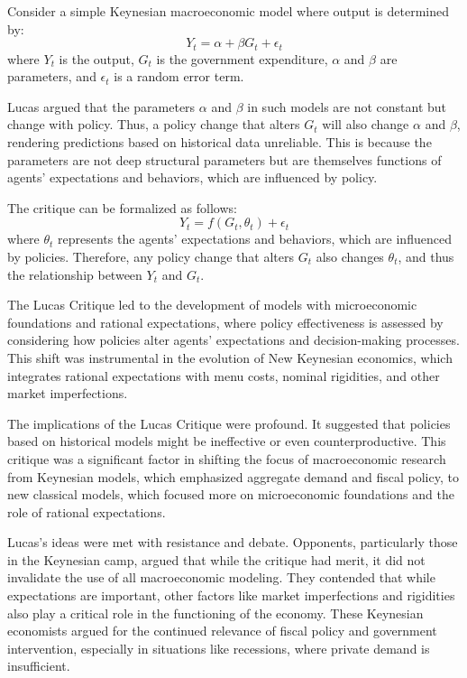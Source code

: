 \documentclass[12pt]{article}
\begin{document}
Consider a simple Keynesian macroeconomic model where output is determined by:
\begin{equation}
    Y_t = \alpha + \beta G_t + \epsilon_t
\end{equation}
where \(Y_t\) is the output, \(G_t\) is the government expenditure, \(\alpha\) and \(\beta\) are parameters, and
\(\epsilon_t\) is a random error term. 

Lucas argued that the parameters \(\alpha\) and \(\beta\) in such models are not constant but change with policy. Thus,
a policy change that alters \(G_t\) will also change \(\alpha\) and \(\beta\), rendering predictions based on historical
data unreliable. This is because the parameters are not deep structural parameters but are themselves functions of
agents' expectations and behaviors, which are influenced by policy. 

The critique can be formalized as follows:
\begin{equation}
    Y_t = f(G_t, \theta_t) + \epsilon_t
\end{equation}
where \(\theta_t\) represents the agents' expectations and behaviors, which are influenced by policies. Therefore, any
policy change that alters \(G_t\) also changes \(\theta_t\), and thus the relationship between \(Y_t\) and \(G_t\). 

The Lucas Critique led to the development of models with microeconomic foundations and rational expectations, where
policy effectiveness is assessed by considering how policies alter agents' expectations and decision-making processes.
This shift was instrumental in the evolution of New Keynesian economics, which integrates rational expectations with
menu costs, nominal rigidities, and other market imperfections. 

The implications of the Lucas Critique were profound. It suggested that policies based on historical models might be
ineffective or even counterproductive. This critique was a significant factor in shifting the focus of macroeconomic
research from Keynesian models, which emphasized aggregate demand and fiscal policy, to new classical models, which
focused more on microeconomic foundations and the role of rational expectations. 

Lucas's ideas were met with resistance and debate. Opponents, particularly those in the Keynesian camp, argued that
while the critique had merit, it did not invalidate the use of all macroeconomic modeling. They contended that while
expectations are important, other factors like market imperfections and rigidities also play a critical role in the
functioning of the economy. These Keynesian economists argued for the continued relevance of fiscal policy and
government intervention, especially in situations like recessions, where private demand is insufficient. 
\end{document}
